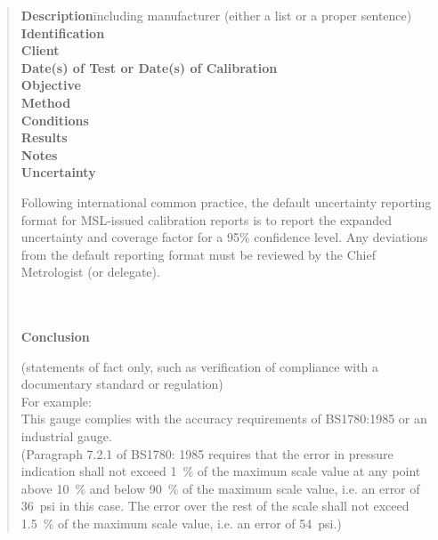 \begin{quote}
\begin{tabbing}
\textbf{Description}\hspace{12mm}\=including manufacturer (either a list or a proper sentence)\\[\baselineskip]

\textbf{Identification}\mbox{}\\[\baselineskip]

\textbf{Client}\mbox{}\\[\baselineskip]

\textbf{Date(s) of Test or Date(s) of Calibration}\mbox{}\\[\baselineskip]

\textbf{Objective}\mbox{}\\[\baselineskip]

\textbf{Method}\mbox{}\\[\baselineskip]

\textbf{Conditions}\mbox{}\\[\baselineskip]

\textbf{Results}\mbox{}\\[\baselineskip]

\textbf{Notes}\mbox{}\\[\baselineskip]

\textbf{Uncertainty}\>\begin{minipage}[t]{.7\textwidth}
Following international common practice, the default uncertainty reporting format for MSL-issued calibration reports is to report the expanded uncertainty and coverage factor for a 95\% confidence level. Any deviations from the default reporting format must be reviewed by the Chief Metrologist (or delegate).
\end{minipage}

\\

\\

\textbf{Conclusion}\>\begin{minipage}[t]{.7\textwidth}
(statements of fact only, such as verification of compliance with a documentary standard or regulation)\\[\baselineskip]
For example:\\

This gauge complies with the accuracy requirements of BS1780:1985 or an industrial gauge.\\
(Paragraph 7.2.1 of BS1780: 1985 requires that the error in pressure indication shall not exceed \SI{1}{\%} of the maximum scale value at any point above \SI{10}{\%} and below \SI{90}{\%} of the maximum scale value, i.e. an error of \SI{36}{psi} in this case. 
The error over the rest of the scale shall not exceed \SI{1.5}{\%} of the maximum scale value, i.e. an error of \SI{54}{psi}.)\\


\end{minipage}
\end{tabbing}
\end{quote}
